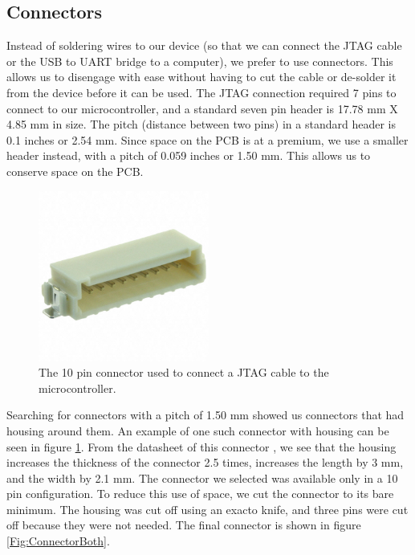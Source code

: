 \subsection{Connectors}
\label{Sec:Connetors}
Instead of soldering wires to our device (so that we can connect the JTAG cable or the USB to UART bridge to a computer), we prefer to use connectors. This allows us to disengage with ease without having to cut the cable or de-solder it from the device before it can be used. The JTAG connection required 7 pins to connect to our microcontroller, and a standard seven pin header is 17.78 mm X 4.85 mm in size. The pitch (distance between two pins) in a standard header is 0.1 inches or 2.54 mm. Since space on the PCB is at a premium, we use a smaller header instead, with a pitch of 0.059 inches or 1.50 mm. This allows us to conserve space on the PCB.
\begin{figure}
\begin{center}
\includegraphics[width=0.5\textwidth]{images/ConnectorWhole.JPG}
\caption{The 10 pin connector used to connect a JTAG cable to the microcontroller.}
\label{Fig:ConnectorWhole}
\end{center}
\end{figure}
Searching for connectors with a pitch of 1.50 mm showed us connectors that had housing around them.
An example of one such connector with housing can be seen in figure \ref{Fig:ConnectorWhole}.
From the datasheet of this connector \cite{Datasheet:TEConnHeader},
we see that the housing increases the thickness of the connector 2.5 times,
increases the length by 3 mm,
and the width by 2.1 mm. The connector we selected was available only in a 10 pin configuration.
To reduce this use of space, we cut the connector to its bare minimum.
The housing was cut off using an exacto knife,
and three pins were cut off because they were not needed.
The final connector is shown in figure \ref{Fig:ConnectorBoth}.
